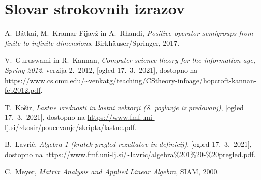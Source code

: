 \documentclass[mat1]{fmfdelo}
\begin{document}
\section*{Slovar strokovnih izrazov}

\geslo{}{}
\geslo{}{}

\begin{thebibliography}{99}

 A.~B\'{a}tkai, M.~Kramar Fijavž in A.~Rhandi, \emph{Positive operator semigroups from finite to infinite dimensions}, Birkh\"{a}user/Springer, 2017.

 V.~Guruswami in R.~Kannan, \emph{Computer science theory for the information age, Spring 2012}, verzija 2.~2012, [ogled 17.~3.~2021], dostopno na \url{https://www.cs.cmu.edu/~venkatg/teaching/CStheory-infoage/hopcroft-kannan-feb2012.pdf}.

 T.~Košir, \emph{Lastne vrednosti in lastni vektorji (8. poglavje iz predavanj)}, [ogled 17.~3.~2021], dostopno na \url{https://www.fmf.uni-lj.si/~kosir/poucevanje/skripta/lastne.pdf}.

 B.~Lavrič, \emph{Algebra 1 (kratek pregled rezultatov in definicij)}, [ogled 17.~3.~2021], dostopno na \url{https://www.fmf.uni-lj.si/~lavric/algebra%201%20-%20pregled.pdf}.

 C.~Meyer, \emph{Matrix Analysis and Applied Linear Algebra}, SIAM, 2000.


\end{thebibliography}
\end{document}
